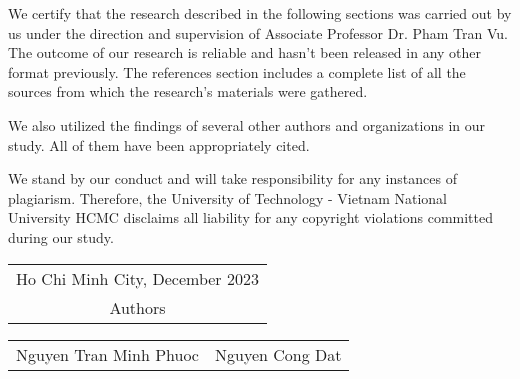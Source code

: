 We certify that the research described in the following sections was carried out by us under the direction and supervision of Associate Professor Dr. Pham Tran Vu. The outcome of our research is reliable and hasn't been released in any other format previously. The references section includes a complete list of all the sources from which the research's materials were gathered.

We also utilized the findings of several other authors and organizations in our study. All of them have been appropriately cited.

We stand by our conduct and will take responsibility for any instances of plagiarism. Therefore, the University of Technology - Vietnam National University HCMC disclaims all liability for any copyright violations committed during our study.

\begin{flushright}
\begin{tabular}{c}
    Ho Chi Minh City, December 2023\\
    Authors\\
\end{tabular}
\vspace{1cm}
\end{flushright}
\begin{flushright}
\begin{tabular}{cc}
    Nguyen Tran Minh Phuoc & Nguyen Cong Dat
\end{tabular}
\end{flushright}